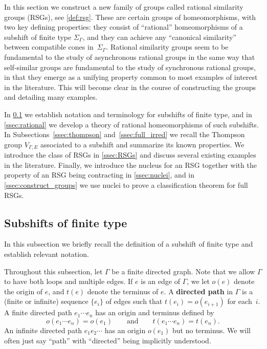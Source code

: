 \documentclass[11pt,letterpaper]{amsart}
\theoremstyle{definition}
\newcommand{\newword}[1]{\textbf{#1}}
\begin{document}
In this section we construct a new family of groups called rational similarity groups (RSGs), see \cref{def:rsg}. These are certain groups of homeomorphisms, with two key defining properties: they consist of ``rational'' homeomorphisms of a subshift of finite type $\Sigma_\Gamma$, and they can achieve any ``canonical similarity'' between compatible cones in~$\Sigma_\Gamma$. Rational similarity groups seem to be fundamental to the study of asynchronous rational groups in the same way that self-similar groups are fundamental to the study of synchronous rational groups, in that they emerge as a unifying property common to most examples of interest in the literature. This will become clear in the course of constructing the groups and detailing many examples.

In \cref{ssec:subshifts} we establish notation and terminology for subshifts of finite type, and in \cref{ssec:rational} we develop a theory of rational homeomorphisms of such subshifts.  In Subsections~\ref{ssec:thompson} and~\ref{ssec:full_irred} we recall the Thompson group $V_{\Gamma,E}$ associated to a subshift and summarize its known properties. We introduce the class of RSGs in \cref{ssec:RSGs} and discuss several existing examples in the literature.  Finally, we introduce the nucleus for an RSG together with the property of an RSG being contracting in \cref{ssec:nuclei}, and in \cref{ssec:construct_groups} we use nuclei to prove a classification theorem for full RSGs.


\subsection{Subshifts of finite type}\label{ssec:subshifts}

In this subsection we briefly recall the definition of a subshift of finite type and establish relevant notation.

Throughout this subsection, let $\Gamma$ be a finite directed graph. Note that we allow $\Gamma$ to have both loops and multiple edges.  If $e$ is an edge of $\Gamma$, we let $o(e)$ denote the origin of $e$, and $t(e)$ denote the terminus of $e$. A \newword{directed path} in $\Gamma$ is a (finite or infinite) sequence $\{e_i\}$ of edges such that $t(e_i)=o(e_{i+1})$ for each~$i$.  A finite directed path $e_1\cdots e_n$ has an origin and terminus defined by
 \[
 o(e_1\cdots e_n)=o(e_1)\qquad\text{and}\qquad t(e_1\cdots e_n)=t(e_n).
 \]
An infinite directed path $e_1e_2\cdots$ has an origin $o(e_1)$ but no terminus. We will often just say ``path'' with ``directed'' being implicitly understood.
 
\end{document}
